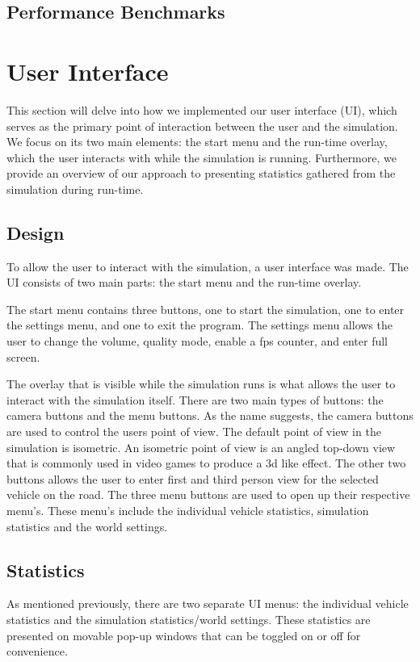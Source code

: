     \subsection{Performance Benchmarks}

\section{User Interface}

This section will delve into how we implemented our user interface (UI), which serves as the primary point of interaction between the user and the simulation. We focus on its two main elements: the start menu and the run-time overlay, which the user interacts with while the simulation is running. Furthermore, we provide an overview of our approach to presenting statistics gathered from the simulation during run-time.
    
    \subsection{Design}
        To allow the user to interact with the simulation, a user interface was made. The UI consists of two main parts: the start menu and the run-time overlay. 
    
        The start menu contains three buttons, one to start the simulation, one to enter the settings menu, and one to exit the program. The settings menu allows the user to change the volume, quality mode, enable a fps counter, and enter full screen. 
    
        The overlay that is visible while the simulation runs is what allows the user to interact with the simulation itself. There are two main types of buttons: the camera buttons and the menu buttons. As the name suggests, the camera buttons are used to control the users point of view. The default point of view in the simulation is isometric. An isometric point of view is an angled top-down view that is commonly used in video games to produce a 3d like effect. The other two buttons allows the user to enter first and third person view for the selected vehicle on the road. The three menu buttons are used to open up their respective menu's. These menu's include the individual vehicle statistics, simulation statistics and the world settings.
        
    \subsection{Statistics}
        As mentioned previously, there are two separate UI menus: the individual vehicle statistics and the simulation statistics/world settings. These statistics are presented on movable pop-up windows that can be toggled on or off for convenience.

